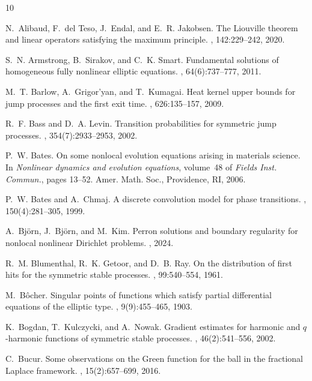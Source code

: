 \documentclass[11pt]{amsart}
\theoremstyle{plain}
\theoremstyle{definition}
\numberwithin{equation}{section}
\begin{document}
\begin{thebibliography}{10}

N.~Alibaud, F.~del Teso, J.~Endal, and E.~R. Jakobsen.
\newblock The {L}iouville theorem and linear operators satisfying the maximum
  principle.
, 142:229--242, 2020.

S.~N. Armstrong, B.~Sirakov, and C.~K. Smart.
\newblock Fundamental solutions of homogeneous fully nonlinear elliptic
  equations.
, 64(6):737--777, 2011.

M.~T. Barlow, A.~Grigor'yan, and T.~Kumagai.
\newblock Heat kernel upper bounds for jump processes and the first exit time.
, 626:135--157, 2009.

R.~F. Bass and D.~A. Levin.
\newblock Transition probabilities for symmetric jump processes.
, 354(7):2933--2953, 2002.

P.~W. Bates.
\newblock On some nonlocal evolution equations arising in materials science.
\newblock In {\em Nonlinear dynamics and evolution equations}, volume~48 of
  {\em Fields Inst. Commun.}, pages 13--52. Amer. Math. Soc., Providence, RI,
  2006.

P.~W. Bates and A.~Chmaj.
\newblock A discrete convolution model for phase transitions.
, 150(4):281--305, 1999.

A.~Bj{\"o}rn, J.~Bj{\"o}rn, and M.~Kim.
\newblock Perron solutions and boundary regularity for nonlocal nonlinear
  {D}irichlet problems.
, 2024.

R.~M. Blumenthal, R.~K. Getoor, and D.~B. Ray.
\newblock On the distribution of first hits for the symmetric stable processes.
, 99:540--554, 1961.

M.~B{\^o}cher.
\newblock Singular points of functions which satisfy partial differential
  equations of the elliptic type.
, 9(9):455--465, 1903.

K.~Bogdan, T.~Kulczycki, and A.~Nowak.
\newblock Gradient estimates for harmonic and {$q$}-harmonic functions of
  symmetric stable processes.
, 46(2):541--556, 2002.

C.~Bucur.
\newblock Some observations on the {G}reen function for the ball in the
  fractional {L}aplace framework.
, 15(2):657--699, 2016.


\end{thebibliography}
\end{document}
